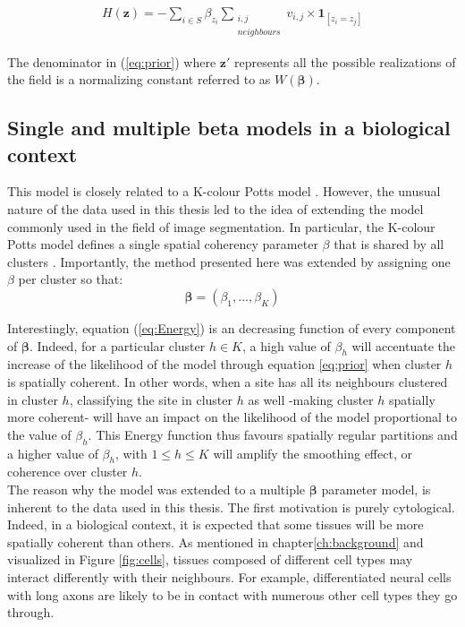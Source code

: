 \begin{align}
\label{eq:Energy}
H(\boldsymbol{z}) = - \sum\limits_{i \in S}\beta_{z_i}\sum_{\substack{i,j\\neighbours}}v_{i,j}\times\boldsymbol{1}_{[z_i = z_j]} 
\end{align}

The denominator in (\ref{eq:prior}) where $\boldsymbol{z'}$ represents all the possible realizations of the field is a normalizing constant referred to as $W(\boldsymbol{\beta})$.\\

	\subsection{Single and multiple beta models in a biological context}
This model is closely related to a K-colour Potts model \cite{Wu82}. However, the unusual nature of the data used in this thesis led to the idea of extending the model commonly used in the field of image segmentation. In particular, the K-colour Potts model defines a single spatial coherency parameter $\beta$ that is shared by all clusters \cite{subudhi14,zhang14}. Importantly, the method presented here was extended by assigning one $\beta$ per cluster so that:
\begin{equation*}
\label{eq:beta}
\boldsymbol{\beta} = (\beta_{1},...,\beta_{K})
\end{equation*}

 Interestingly, equation (\ref{eq:Energy}) is an decreasing function of every component of $\boldsymbol{\beta}$. Indeed, for a particular cluster $h \in K$, a high value of $\beta_h$ will accentuate the increase of the likelihood of the model through equation \ref{eq:prior} when cluster $h$ is spatially coherent. In other words, when a site has all its neighbours clustered in cluster $h$, classifying the site in cluster $h$ as well -making cluster $h$ spatially more coherent- will have an impact on the likelihood of the model proportional to the value of $\beta_h$. This Energy function thus favours spatially regular partitions and a higher value of $\beta_h$, with $1 \leq h \leq K $ will amplify the smoothing effect, or coherence over cluster $h$.\\
 
 The reason why the model was extended to a multiple $\boldsymbol{\beta}$ parameter model, is inherent to the data used in this thesis. The first motivation is purely cytological. Indeed, in a biological context, it is expected that some tissues will be more spatially coherent than others. As mentioned in chapter\ref{ch:background} and visualized in Figure \ref{fig:cells}, tissues composed of different cell types may interact differently with their neighbours. For example, differentiated neural cells with long axons are likely to be in contact with numerous other cell types they go through.\\
 
